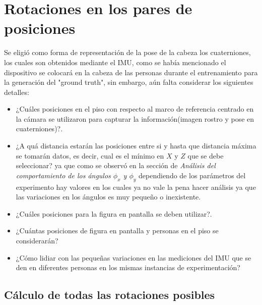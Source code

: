        \section{Rotaciones en los pares de posiciones}
       Se eligió como forma de representación de la pose de la cabeza los cuaterniones, los cuales son obtenidos mediante el IMU, como se había mencionado el dispositivo se colocará en la cabeza de las personas durante el entrenamiento para la generación del "ground truth", sin embargo, aún falta considerar los siguientes detalles:
       \begin{itemize}
       	\item ¿Cuáles posiciones en el piso con respecto al marco de referencia centrado en la cámara  se utilizaron para capturar la información(imagen rostro y pose en cuaterniones)?.
       	\item ¿A quá distancia estarán las posiciones entre si y hasta que distancia máxima se tomarán datos, es decir, cual es el mínimo en $X$ y $Z$ que se debe seleccionar? ya que como se observó en la sección de \textit{Análisis del comportamiento de los ángulos $\phi_x$ y $\phi_y$} dependiendo de los parámetros del experimento hay valores en los cuales ya no vale la pena hacer análisis ya que las variaciones en los ángulos es muy pequeño o inexistente.
       	\item ¿Cuáles posiciones para la figura en pantalla se deben utilizar?.
       	\item ¿Cuántas posiciones de figura en pantalla y personas en el piso se considerarán?
       	\item ¿Cómo lidiar con las pequeñas variaciones en las mediciones del IMU que se den en diferentes personas en los mismas instancias de experimentación?
       	
       \end{itemize} 
       
       \subsection{Cálculo de todas las rotaciones posibles}
